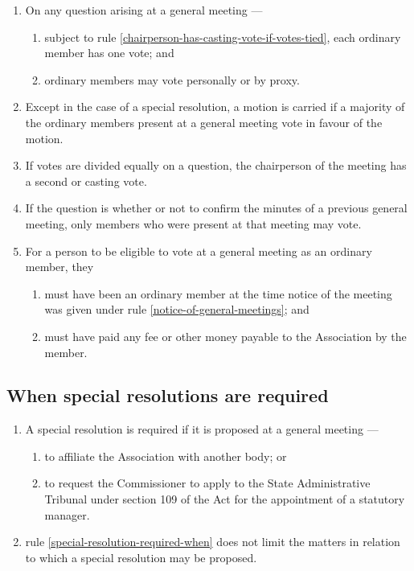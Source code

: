 \documentclass[../constitution.tex]{subfiles}
\begin{document}
\begin{enumerate}

\item On any question arising at a general meeting ---

  \begin{enumerate}
  
  \item subject to rule \ref{chairperson-has-casting-vote-if-votes-tied}, each ordinary member has one vote; and
  \item ordinary members may vote personally or by proxy.
  \end{enumerate}
\item Except in the case of a special resolution, a motion is carried if a majority of the ordinary members present at a general meeting vote in favour of the motion.
\item If votes are divided equally on a question, the chairperson of the meeting has a second or casting vote. \label{chairperson-has-casting-vote-if-votes-tied}
\item If the question is whether or not to confirm the minutes of a previous general meeting, only members who were present at that meeting may vote.
\item For a person to be eligible to vote at a general meeting as an ordinary member, they

  \begin{enumerate}
  
  \item must have been an ordinary member at the time notice of the meeting was given under rule \ref{notice-of-general-meetings}; and
  \item must have paid any fee or other money payable to the Association by the member.
  \end{enumerate}
\end{enumerate}

\hypertarget{when-special-resolutions-are-required}{%
\subsection{When special resolutions are required}\label{when-special-resolutions-are-required}}

\begin{enumerate}

\item A special resolution is required if it is proposed at a general meeting --- \label{special-resolution-required-when}

  \begin{enumerate}
  
  \item to affiliate the Association with another body; or
  \item to request the Commissioner to apply to the State Administrative Tribunal under section 109 of the Act for the appointment of a statutory manager.
  \end{enumerate}
\item rule \ref{special-resolution-required-when} does not limit the matters in relation to which a special resolution may be proposed.
\end{enumerate}
\end{document}
